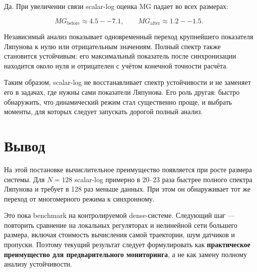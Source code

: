 \documentclass[10pt,a4paper]{article}
\begin{document}
Да. При увеличении связи scalar-log оценка MG падает во всех размерах:

\[
MG_{\mathrm{before}}\approx 4.5--7.1,
\qquad
MG_{\mathrm{after}}\approx 1.2--1.5.
\]

Независимый анализ показывает одновременный переход крупнейшего показателя Ляпунова к нулю или отрицательным значениям. Полный спектр также становится устойчивым: его максимальный показатель после синхронизации находится около нуля и отрицателен с учётом конечной точности расчёта.

Таким образом, scalar-log не восстанавливает спектр устойчивости и не заменяет его в задачах, где нужны сами показатели Ляпунова. Его роль другая: быстро обнаружить, что динамический режим стал существенно проще, и выбрать моменты, для которых следует запускать дорогой полный анализ.

\section*{Вывод}

На этой постановке вычислительное преимущество появляется при росте размера системы. Для $N=128$ scalar-log примерно в 20--23 раза быстрее полного спектра Ляпунова и требует в 128 раз меньше данных. При этом он обнаруживает тот же переход от многомерного режима к синхронному.

Это пока benchmark на контролируемой dense-системе. Следующий шаг --- повторить сравнение на локальных регуляторах и нелинейной сети большего размера, включая стоимость вычисления самой траектории, шум датчиков и пропуски. Поэтому текущий результат следует формулировать как \textbf{практическое преимущество для предварительного мониторинга}, а не как замену полному анализу устойчивости.
\end{document}
